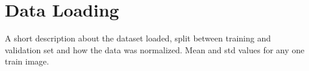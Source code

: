 \section{Data Loading}
A short description about the dataset loaded, split between training and
validation set and how the data was normalized. Mean and std values for any one
train image.
